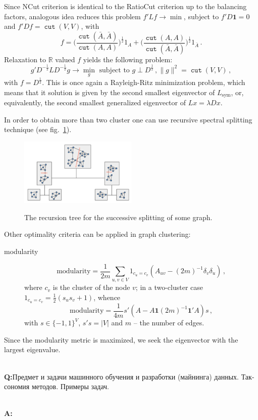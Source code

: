 \documentclass[a4paper,14pt]{extarticle}
\newcommand{\Real}{\mathbb{R}}
\newcommand{\cut}{\mathop{\mathtt{cut}}\nolimits}
\newcommand{\one}{\mathbf{1}}
\newcommand{\rus}[1]{\foreignlanguage{russian}{#1}}
\begin{document}
Since NCut criterion is identical to the RatioCut criterion up to the balancing
factors, analogous idea reduces this problem $f'Lf \to \min$, subject to $f'D\one = 0$
and $f'Df = \cut(V,V)$, with 
$$ f
    = \biggl(\frac{\cut(\bar{A},\bar{A})}{\cut(A,A)}\biggr)^\frac{1}{2} 1_A
    + \biggl(\frac{\cut(A,A)}{\cut(\bar{A},\bar{A})}\biggr)^\frac{1}{2} 1_{\bar{A}}
    \,. $$
Relaxation to $\Real$ valued $f$ yields the following problem:
$$ g' D^{-\frac{1}{2}} L D^{-\frac{1}{2}} g \to \min_g
    \text{ subject to } g\perp D^\frac{1}{2}\,,
    \|g\|^2 = \cut(V,V)
    \,, $$
with $f=D^\frac{1}{2}$. This is once again a Rayleigh-Ritz minimization problem, which 
means that it solution is given by the second smallest eigenvector of $L_\text{sym}$,
or, equivalently, the second smallest generalized eigenvector of $Lx = \lambda D x$.


In order to obtain more than two cluster one can use recursive spectral splitting
technique (see fig.~\ref{fig:recursive_split}).
\begin{figure}
    \centering
    \includegraphics[width=0.5\textwidth]{recursive_split.png}
    \label{fig:recursive_split}
    \caption{The recursion tree for the successive splitting of some graph.}
\end{figure}

Other optimality criteria can be applied in graph clustering: \begin{description}
    \item[modularity]
    $$ \text{modularity} =
        \frac{1}{2m} \sum_{u,v\in V} 1_{c_u=c_v}
            (A_{uv} - (2m)^{-1} \delta_v \delta_u)\,,$$
    where $c_v$ is the cluster of the node $v$; in a two-cluster case $1_{c_u=c_v}
    = \frac{1}{2}(s_u s_v + 1)$, whence
    $$ \text{modularity} = \frac{1}{4m} s'(A - A \one (2m)^{-1} \one'A) s\,,$$
    with $s\in \{-1,1\}^V$, $s's = |V|$ and $m$ -- the number of edges.
\end{description}
Since the modularity metric is maximized, we seek the eigenvector with the largest eigenvalue.

\hfill\\\textbf{Q:}\rus{Предмет и задачи машинного обучения и разработки (майнинга)
данных. Таксономия методов. Примеры задач.}

\hfill\\\textbf{A:}

\end{document}
